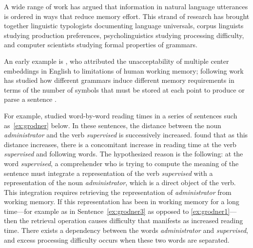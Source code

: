 A wide range of work has argued that information in natural language utterances is ordered in ways that reduce memory effort.
This strand of research has brought together linguistic typologists documenting language universals, corpus linguists studying production preferences, psycholinguistics studying processing difficulty, and computer scientists studying formal properties of grammars.

An early example is \cite{miller-finitary-1963}, who attributed the unacceptability of multiple center embeddings in English to limitations of human working memory; following work has studied how different grammars induce different memory requirements in terms of the number of symbols that must be stored at each point to produce or parse a sentence \citet{yngve1960model,yngve1961depth,abney1991memory,gibson1991computational,resnik1992left}.

For example, \citet{grodner-consequences-2005} studied word-by-word reading times in a series of sentences such as~\ref{ex:grodner} below. 
In these sentences, the distance between the noun \emph{administrator} and the verb \emph{supervised} is successively increased. \citet{grodner-consequences-2005} found that as this distance increases, there is a concomitant increase in reading time at the verb \emph{supervised} and following words. The hypothesized reason is the following: at the word \emph{supervised}, a comprehender who is trying to compute the meaning of the sentence must integrate a representation of the verb \emph{supervised} with a representation of the noun \emph{administrator}, which is a direct object of the verb. This integration requires retrieving the representation of \emph{administrator} from working memory. If this representation has been in working memory for a long time---for example as in Sentence~\ref{ex:grodner3} as opposed to \ref{ex:grodner1}---then the retrieval operation causes difficulty that manifests as increased reading time. There exists a dependency between the words \emph{administrator} and \emph{supervised}, and excess processing difficulty occurs when these two words are separated. 


